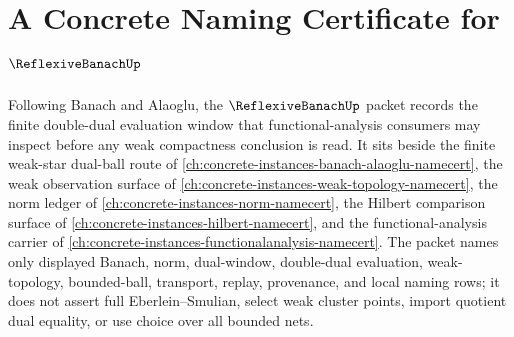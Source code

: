 \chapter{A Concrete Naming Certificate for $\ReflexiveBanachUp$}
\label{ch:concrete-instances-reflexive-banach-namecert}

Following Banach and Alaoglu, the $\ReflexiveBanachUp$ packet records the finite double-dual evaluation window that functional-analysis consumers may inspect before any weak compactness conclusion is read. It sits beside the finite weak-star dual-ball route of \autoref{ch:concrete-instances-banach-alaoglu-namecert}, the weak observation surface of \autoref{ch:concrete-instances-weak-topology-namecert}, the norm ledger of \autoref{ch:concrete-instances-norm-namecert}, the Hilbert comparison surface of \autoref{ch:concrete-instances-hilbert-namecert}, and the functional-analysis carrier of \autoref{ch:concrete-instances-functionalanalysis-namecert}. The packet names only displayed Banach, norm, dual-window, double-dual evaluation, weak-topology, bounded-ball, transport, replay, provenance, and local naming rows; it does not assert full Eberlein--Smulian, select weak cluster points, import quotient dual equality, or use choice over all bounded nets.

